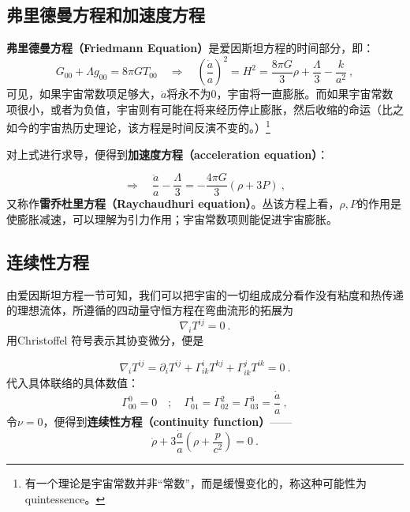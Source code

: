 
\subsection{弗里德曼方程和加速度方程}
\textbf{弗里德曼方程（Friedmann Equation）}是爱因斯坦方程的时间部分，即：
\begin{equation}\label{eq_Frieq_2}G_{00}+\Lambda g_{00}=8\pi GT_{00}\quad\Rightarrow\quad\left(\frac{\dot{a}}{a}\right)^2=H^2=\frac{8\pi G}{3}\rho+\frac{\Lambda}{3}-\frac{k}{a^2}~,\end{equation}
可见，如果宇宙常数项足够大，$\dot a$将永不为0，宇宙将一直膨胀。而如果宇宙常数项很小，或者为负值，宇宙则有可能在将来经历停止膨胀，然后收缩的命运（比之如今的宇宙热历史理论，该方程是时间反演不变的。）\footnote{有一个理论是宇宙常数并非“常数”，而是缓慢变化的，称这种可能性为quintessence。}

对上式进行求导，便得到\textbf{加速度方程（acceleration equation）}：

\begin{equation}
\Rightarrow\quad\frac{\ddot{a}}{a}-\frac{\Lambda}{3}=-\frac{4\pi G}{3}(\rho+3P)~,
\end{equation}
又称作\textbf{雷乔杜里方程（Raychaudhuri equation）}。丛该方程上看，$\rho,P$的作用是使膨胀减速，可以理解为引力作用；宇宙常数项则能促进宇宙膨胀。

\subsection{连续性方程}
由爱因斯坦方程一节可知，我们可以把宇宙的一切组成成分看作没有粘度和热传递的理想流体，所遵循的四动量守恒方程在弯曲流形的拓展为
\begin{equation}
\nabla_{i}T^{ij}=0~.
\end{equation}
用Christoffel 符号表示其协变微分，便是

\begin{equation}\nabla_iT^{ij}=\partial_iT^{ij}+\Gamma_{ik}^iT^{kj}+\Gamma_{ik}^jT^{ik}=0~.
\end{equation}
代入具体联络的具体数值：
\begin{equation}\Gamma_{00}^0=0\quad;\quad\Gamma_{01}^1=\Gamma_{02}^2=\Gamma_{03}^3=\frac{\dot{a}}{a}~,\end{equation}
令$\nu=0$，便得到\textbf{连续性方程（continuity function）}——
\begin{equation}\label{eq_Frieq_1}
\dot{\rho}+3\frac{\dot{a}}{a}\left(\rho+\frac{p}{c^2}\right)=0~.
\end{equation}

